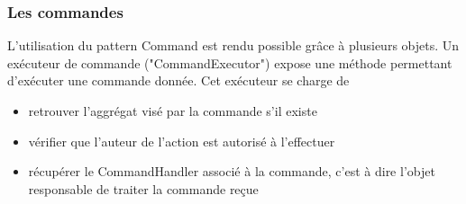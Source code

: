 \subsubsection{Les commandes}
\label{subs:Les commandes}
L'utilisation du pattern Command est rendu possible grâce à plusieurs objets.
Un exécuteur de commande ("CommandExecutor") expose une méthode permettant d'exécuter une commande donnée.
Cet exécuteur se charge de
\begin{itemize}
  \item retrouver l'aggrégat visé par la commande s'il existe
  \item vérifier que l'auteur de l'action est autorisé à l'effectuer
  \item récupérer le CommandHandler associé à la commande, c'est à dire l'objet responsable de traiter la commande reçue
\end{itemize}

